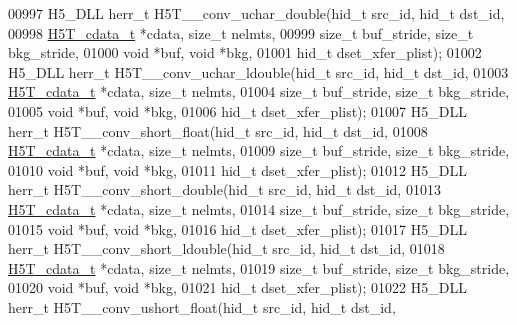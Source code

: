 \begin{DoxyCode}
00997 H5\_DLL herr\_t H5T\_\_conv\_uchar\_double(hid\_t src\_id, hid\_t dst\_id,
00998                      \hyperlink{struct_h5_t__cdata__t}{H5T\_cdata\_t} *cdata, \textcolor{keywordtype}{size\_t} nelmts,
00999                      \textcolor{keywordtype}{size\_t} buf\_stride, \textcolor{keywordtype}{size\_t} bkg\_stride,
01000                                      \textcolor{keywordtype}{void} *buf, \textcolor{keywordtype}{void} *bkg,
01001                                      hid\_t dset\_xfer\_plist);
01002 H5\_DLL herr\_t H5T\_\_conv\_uchar\_ldouble(hid\_t src\_id, hid\_t dst\_id,
01003                      \hyperlink{struct_h5_t__cdata__t}{H5T\_cdata\_t} *cdata, \textcolor{keywordtype}{size\_t} nelmts,
01004                      \textcolor{keywordtype}{size\_t} buf\_stride, \textcolor{keywordtype}{size\_t} bkg\_stride,
01005                                      \textcolor{keywordtype}{void} *buf, \textcolor{keywordtype}{void} *bkg,
01006                                      hid\_t dset\_xfer\_plist);
01007 H5\_DLL herr\_t H5T\_\_conv\_short\_float(hid\_t src\_id, hid\_t dst\_id,
01008                      \hyperlink{struct_h5_t__cdata__t}{H5T\_cdata\_t} *cdata, \textcolor{keywordtype}{size\_t} nelmts,
01009                      \textcolor{keywordtype}{size\_t} buf\_stride, \textcolor{keywordtype}{size\_t} bkg\_stride,
01010                                      \textcolor{keywordtype}{void} *buf, \textcolor{keywordtype}{void} *bkg,
01011                                      hid\_t dset\_xfer\_plist);
01012 H5\_DLL herr\_t H5T\_\_conv\_short\_double(hid\_t src\_id, hid\_t dst\_id,
01013                      \hyperlink{struct_h5_t__cdata__t}{H5T\_cdata\_t} *cdata, \textcolor{keywordtype}{size\_t} nelmts,
01014                      \textcolor{keywordtype}{size\_t} buf\_stride, \textcolor{keywordtype}{size\_t} bkg\_stride,
01015                                      \textcolor{keywordtype}{void} *buf, \textcolor{keywordtype}{void} *bkg,
01016                                      hid\_t dset\_xfer\_plist);
01017 H5\_DLL herr\_t H5T\_\_conv\_short\_ldouble(hid\_t src\_id, hid\_t dst\_id,
01018                      \hyperlink{struct_h5_t__cdata__t}{H5T\_cdata\_t} *cdata, \textcolor{keywordtype}{size\_t} nelmts,
01019                      \textcolor{keywordtype}{size\_t} buf\_stride, \textcolor{keywordtype}{size\_t} bkg\_stride,
01020                                      \textcolor{keywordtype}{void} *buf, \textcolor{keywordtype}{void} *bkg,
01021                                      hid\_t dset\_xfer\_plist);
01022 H5\_DLL herr\_t H5T\_\_conv\_ushort\_float(hid\_t src\_id, hid\_t dst\_id,

\end{DoxyCode}
